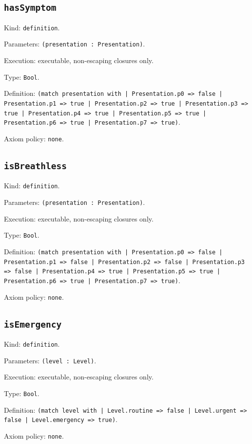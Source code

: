 \documentclass[11pt]{article}
\begin{document}
\subsection*{\texttt{hasSymptom}}
\noindent Kind: \texttt{definition}.\par
\noindent Parameters: \texttt{(presentation : Presentation)}.\par
\noindent Execution: executable, non-escaping closures only.\par
\noindent Type: \texttt{Bool}.\par
\noindent Definition: \texttt{(match presentation with | Presentation.p0 => false | Presentation.p1 => true | Presentation.p2 => true | Presentation.p3 => true | Presentation.p4 => true | Presentation.p5 => true | Presentation.p6 => true | Presentation.p7 => true)}.\par
\noindent Axiom policy: \texttt{none}.\par
\subsection*{\texttt{isBreathless}}
\noindent Kind: \texttt{definition}.\par
\noindent Parameters: \texttt{(presentation : Presentation)}.\par
\noindent Execution: executable, non-escaping closures only.\par
\noindent Type: \texttt{Bool}.\par
\noindent Definition: \texttt{(match presentation with | Presentation.p0 => false | Presentation.p1 => false | Presentation.p2 => false | Presentation.p3 => false | Presentation.p4 => true | Presentation.p5 => true | Presentation.p6 => true | Presentation.p7 => true)}.\par
\noindent Axiom policy: \texttt{none}.\par
\subsection*{\texttt{isEmergency}}
\noindent Kind: \texttt{definition}.\par
\noindent Parameters: \texttt{(level : Level)}.\par
\noindent Execution: executable, non-escaping closures only.\par
\noindent Type: \texttt{Bool}.\par
\noindent Definition: \texttt{(match level with | Level.routine => false | Level.urgent => false | Level.emergency => true)}.\par
\noindent Axiom policy: \texttt{none}.\par
\end{document}
